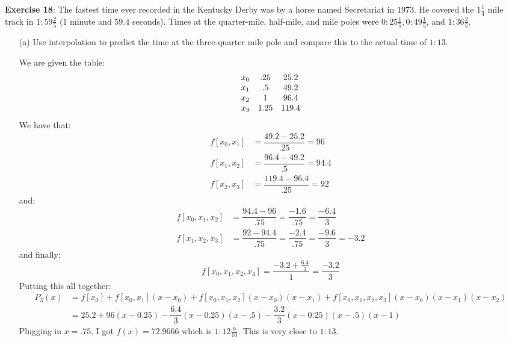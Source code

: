 \documentclass{article}
\begin{document}
\textbf{Exercise 18}: The fastest time ever recorded in the Kentucky Derby was by a horse named Secretariat in $1973$. He covered the $1 \frac{1}{4}$ mile track in $1:59 \frac{2}{5}$ (1 minute and $59.4$ seconds). Times at the quarter-mile, half-mile, and mile poles were $0:25 \frac{1}{5}, 0:49 \frac{1}{5}$, and $1:36 \frac{2}{5}$.
    \begin{itemize}
        \item [(a)] Use interpolation to predict the time at the three-quarter mile pole and compare this to the actual time of $1:13$.
            \begin{answer}
                We are given the table:
                    \begin{align*}
                        \begin{array}{ c c c }
                            x_{0} & .25  & 25.2  \\
                            x_{1} & .5   & 49.2  \\
                            x_{2} & 1    & 96.4  \\
                            x_{3} & 1.25 & 119.4   
                        \end{array}
                    \end{align*}
                We have that:
                    \begin{align*}
                        f[x_{0}, x_{1}] &= \dfrac{49.2 - 25.2}{.25} = 96  \\
                        f[x_{1}, x_{2}] &= \dfrac{96.4 - 49.2}{.5} = 94.4 \\
                        f[x_{2}, x_{3}] &= \dfrac{119.4 - 96.4}{.25} = 92   
                    \end{align*}
                and:
                    \begin{align*}
                        f[x_{0}, x_{1}, x_{2}] &= \dfrac{94.4 - 96}{.75} = \dfrac{-1.6}{.75} = \dfrac{-6.4}{3}        \\
                        f[x_{1}, x_{2}, x_{3}] &= \dfrac{92 - 94.4}{.75} = \dfrac{-2.4}{.75} = \dfrac{-9.6}{3} = -3.2   
                    \end{align*}
                and finally:
                    \begin{equation*}
                        f[x_{0}, x_{1}, x_{2}, x_{4}] = \dfrac{-3.2 + \frac{6.4}{3}}{1} = \dfrac{-3.2}{3}
                    \end{equation*}
                Putting this all together:
                    \begin{align*}
                        P_{3}(x) &= f[x_{0}] + f[x_{0}, x_{1}](x - x_{0}) + f[x_{0}, x_{1}, x_{2}](x - x_{0})(x - x_{1}) + f[x_{0}, x_{1}, x_{2}, x_{3}](x - x_{0})(x - x_{1})(x - x_{2}) \\
                                 &= 25.2 + 96(x - 0.25) - \dfrac{6.4}{3}(x - 0.25)(x - .5) - \dfrac{3.2}{3}(x - 0.25)(x - .5)(x - 1)                                                        
                    \end{align*}
                Plugging in $x = .75$, I got $f(x) = 72.9666$ which is $1 : 12\frac{9}{10}$. This is very close to $1:13$.
            \end{answer}


\end{itemize}
\end{document}
